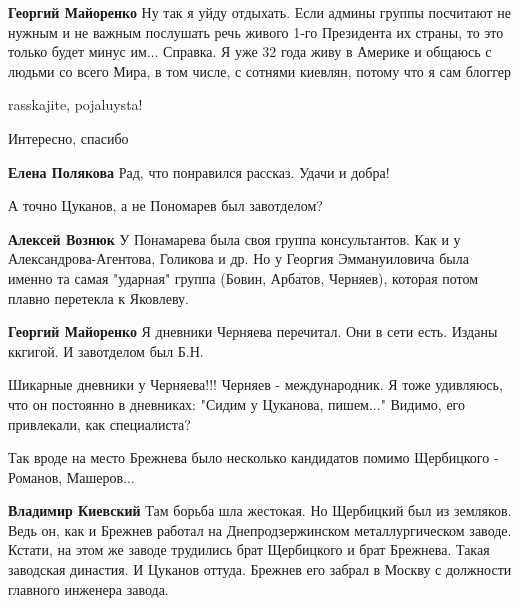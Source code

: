 \begin{itemize}
\begin{itemize}
\begin{itemize}
\textbf{Георгий Майоренко} Ну так я уйду отдыхать.
Если админы группы посчитают не нужным и не важным послушать речь живого 1-го Президента их страны, то это только будет минус им...
Справка. Я уже 32 года живу в Америке и общаюсь с людьми со всего Мира, в том числе, с сотнями киевлян, потому что я сам блоггер
\end{itemize} %

rasskajite, pojaluysta!

\end{itemize} %

Интересно, спасибо

\begin{itemize} %
\textbf{Елена Полякова} Рад, что понравился рассказ. Удачи и добра!
\end{itemize} %

А точно Цуканов, а не Пономарев был завотделом?

\begin{itemize} %
\textbf{Алексей Вознюк} У Понамарева была своя группа консультантов. Как и у Александрова-Агентова, Голикова и др. Но у Георгия Эммануиловича была именно та самая "ударная" группа (Бовин, Арбатов, Черняев), которая потом плавно перетекла к Яковлеву.

\begin{itemize} %
\textbf{Георгий Майоренко} Я дневники Черняева перечитал. Они в сети есть. Изданы ккгигой. И завотделом был Б.Н.


Шикарные дневники у Черняева!!! Черняев - международник. Я тоже удивляюсь, что
он постоянно в дневниках: "Сидим у Цуканова, пишем..." Видимо, его привлекали,
как специалиста?

\end{itemize} %

\end{itemize} %


Так вроде на место Брежнева было несколько кандидатов помимо Щербицкого -
Романов, Машеров...

\begin{itemize} %
\textbf{Владимир Киевский} Там борьба шла жестокая. Но Щербицкий был из земляков. Ведь он, как и Брежнев работал на Днепродзержинском металлургическом заводе. Кстати, на этом же заводе трудились брат Щербицкого и брат Брежнева. Такая заводская династия. И Цуканов оттуда. Брежнев его забрал в Москву с должности главного инженера завода.


\end{itemize}
\end{itemize}
